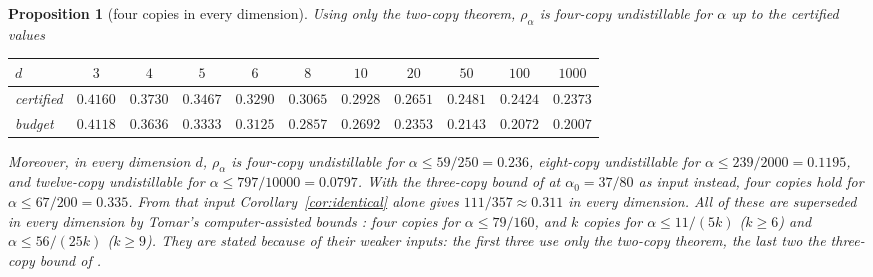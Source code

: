 \documentclass[11pt]{article}
\newtheorem{proposition}[theorem]{Proposition}
\theoremstyle{remark}
\begin{document}
\begin{proposition}[four copies in every dimension]\label{prop:everyd}
Using only the two-copy theorem, $\rho_\alpha$ is four-copy undistillable for $\alpha$ up to the certified values
\begin{center}
\small\setlength{\tabcolsep}{4pt}
\begin{tabular}{lcccccccccc}
\toprule
$d$ & $3$ & $4$ & $5$ & $6$ & $8$ & $10$ & $20$ & $50$ & $100$ & $1000$\\
\midrule
certified & $0.4160$ & $0.3730$ & $0.3467$ & $0.3290$ & $0.3065$ & $0.2928$ & $0.2651$ & $0.2481$ & $0.2424$ & $0.2373$\\
budget & $0.4118$ & $0.3636$ & $0.3333$ & $0.3125$ & $0.2857$ & $0.2692$ & $0.2353$ & $0.2143$ & $0.2072$ & $0.2007$\\
\bottomrule
\end{tabular}
\end{center}
Moreover, in every dimension $d$, $\rho_\alpha$ is four-copy undistillable for $\alpha\le59/250=0.236$,
eight-copy undistillable for $\alpha\le239/2000=0.1195$, and twelve-copy undistillable for $\alpha\le797/10000=0.0797$.
With the three-copy bound of \cite[Thm.~1.3]{MB} at
$\alpha_0=37/80$ as input instead, four copies hold for $\alpha\le67/200=0.335$. From that input
Corollary~\ref{cor:identical} alone gives $111/357\approx0.311$ in every dimension. All of these are superseded in
every dimension by Tomar's computer-assisted bounds \cite{Tomar}: four copies for $\alpha\le79/160$, and $k$ copies for
$\alpha\le11/(5k)$ ($k\ge6$) and $\alpha\le56/(25k)$ ($k\ge9$). They are stated because of their weaker inputs: the
first three use only the two-copy theorem, the last two the three-copy bound of \cite{MB}.
\end{proposition}
\end{document}
